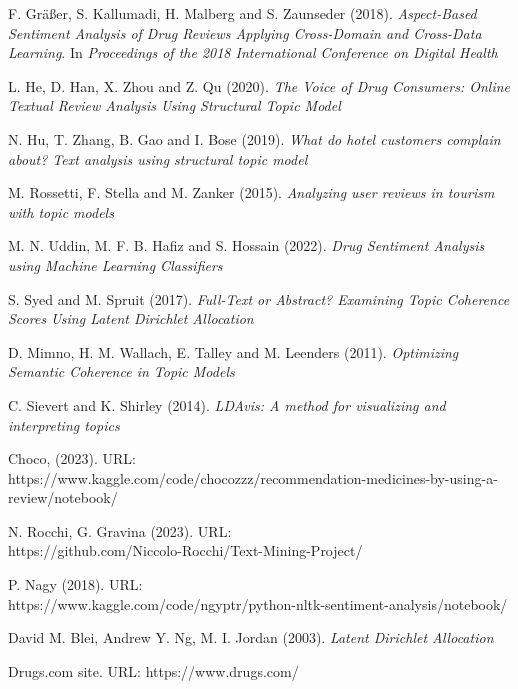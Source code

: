 \documentclass[10pt, a4paper, twocolumn]{article}
\begin{document}
	\renewcommand\refname{References}
        {\footnotesize
	\begin{thebibliography}{99}

             F. Gräßer, S. Kallumadi, H. Malberg and S. Zaunseder (2018). \textit{Aspect-Based Sentiment Analysis of Drug Reviews Applying Cross-Domain and Cross-Data Learning}. In \textit{Proceedings of the 2018 International Conference on Digital Health}
 
              L. He, D. Han, X. Zhou and Z. Qu (2020). \textit{The Voice of Drug Consumers: Online Textual Review Analysis Using Structural Topic Model}
    
              N. Hu, T. Zhang, B. Gao and I. Bose (2019). \textit{What do hotel customers complain about? Text analysis using structural topic model}
             
              M. Rossetti, F. Stella and M. Zanker (2015). \textit{Analyzing user reviews in tourism with topic models}
            
              M. N. Uddin, M. F. B. Hafiz and S. Hossain (2022). \textit{Drug Sentiment Analysis using Machine Learning Classifiers}
    
              S. Syed and M. Spruit (2017). \textit{Full-Text or Abstract? Examining Topic Coherence Scores Using Latent Dirichlet Allocation}
    
              D. Mimno, H. M. Wallach, E. Talley and M. Leenders (2011). \textit{Optimizing Semantic Coherence in Topic Models}
    
              C. Sievert and K. Shirley (2014). \textit{LDAvis: A method for visualizing and interpreting topics}
             
              Choco, (2023). URL:\\ https://www.kaggle.com/code/chocozzz/recommendation-medicines-by-using-a-review/notebook/
             
              N. Rocchi, G. Gravina (2023). URL: \\https://github.com/Niccolo-Rocchi/Text-Mining-Project/
             
              P. Nagy (2018). URL: \\https://www.kaggle.com/code/ngyptr/python-nltk-sentiment-analysis/notebook/
    
             David M. Blei, Andrew Y. Ng, M. I. Jordan (2003). \textit{Latent Dirichlet Allocation}
    
             Drugs.com site. URL: https://www.drugs.com/

            

            

        \end{thebibliography}
        }
\end{document}
